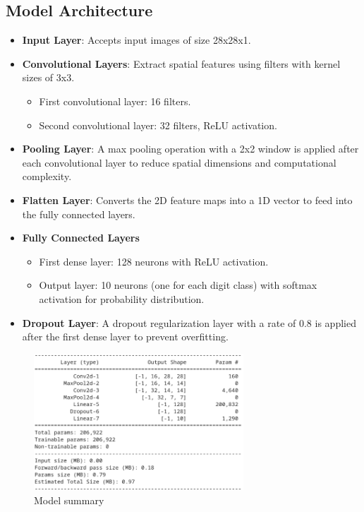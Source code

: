 \subsection{Model Architecture}

\begin{itemize}
  \item \textbf{Input Layer}: Accepts input images of size 28x28x1.
  \item \textbf{Convolutional Layers}: Extract spatial features using filters with kernel sizes of 3x3.
    \begin{itemize}
      \item First convolutional layer: 16 filters.
      \item Second convolutional layer: 32 filters, ReLU activation.
    \end{itemize}
  \item 
    \textbf{Pooling Layer}: A max pooling operation with a 2x2 window is applied after each convolutional layer 
    to reduce spatial dimensions and computational complexity.
  \item 
    \textbf{Flatten Layer}: Converts the 2D feature maps into a 1D vector to feed into the fully connected layers.
  \item \textbf{Fully Connected Layers}
    \begin{itemize}
      \item First dense layer: 128 neurons with ReLU activation.
      \item 
        Output layer: 10 neurons (one for each digit class) with softmax activation for probability distribution.
    \end{itemize}
  \item 
    \textbf{Dropout Layer}: A dropout regularization layer with a rate of 0.8 is applied after the first dense 
    layer to prevent overfitting.
\end{itemize}


\begin{figure}[H]
  \begin{center}
    \includegraphics[width=0.7\textwidth]{img/methodology/model_summary.png}
    \caption{Model summary}
    \label{f:model_summary}
  \end{center}
\end{figure}

